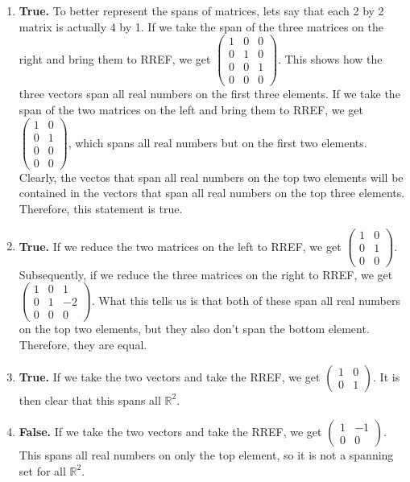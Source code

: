 \documentclass{article}
\begin{document}
\begin{enumerate}
\begin{enumerate}
\item \textbf{True.} To better represent the spans of matrices, lets say that each 2 by 2 matrix is actually 4 by 1. If we take the span of the three matrices on the right and bring them to RREF, we get $\left(\begin{array}{ccc} 1 & 0 & 0 \\ 0 & 1 & 0 \\ 0 & 0 & 1 \\ 0 & 0 & 0 \end{array}\right)$. This shows how the three vectors span all real numbers on the first three elements. If we take the span of the two matrices on the left and bring them to RREF, we get $\left(\begin{array}{cc} 1 & 0 \\ 0 & 1 \\ 0 & 0 \\ 0 & 0 \end{array}\right)$, which spans all real numbers but on the first two elements. Clearly, the vectos that span all real numbers on the top two elements will be contained in the vectors that span all real numbers on the top three elements. Therefore, this statement is true.

\item \textbf{True.} If we reduce the two matrices on the left to RREF, we get $\left(\begin{array}{cc} 1 & 0 \\ 0 & 1 \\ 0 & 0 \end{array}\right)$. Subsequently, if we reduce the three matrices on the right to RREF, we get $\left(\begin{array}{ccc} 1 & 0 & 1\\ 0 & 1 & -2\\ 0 & 0 & 0\end{array}\right)$. What this tells us is that both of these span all real numbers on the top two elements, but they also don't span the bottom element. Therefore, they are equal.

\item \textbf{True.} If we take the two vectors and take the RREF, we get $\left(\begin{array}{cc} 1 & 0 \\ 0 & 1 \end{array}\right)$. It is then clear that this spans all $\mathbb{R}^2$.

\item \textbf{False.} If we take the two vectors and take the RREF, we get $\left(\begin{array}{cc} 1 & -1 \\ 0 & 0 \end{array}\right)$. This spans all real numbers on only the top element, so it is not a spanning set for all $\mathbb{R}^2$.


\end{enumerate}
\end{enumerate}
\end{document}

